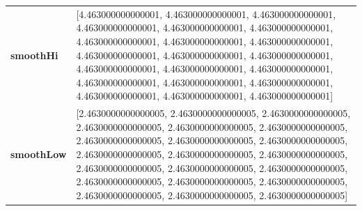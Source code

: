 		\begin{table}[H]
			\centering
			\begin{tabularx}{\textwidth}{lX}
		\textbf{smoothHi}& [4.463000000000001, 4.463000000000001, 4.463000000000001, 4.463000000000001, 4.463000000000001, 4.463000000000001, 4.463000000000001, 4.463000000000001, 4.463000000000001, 4.463000000000001, 4.463000000000001, 4.463000000000001, 4.463000000000001, 4.463000000000001, 4.463000000000001, 4.463000000000001, 4.463000000000001, 4.463000000000001, 4.463000000000001, 4.463000000000001, 4.463000000000001] \\
		\textbf{smoothLow} &[2.4630000000000005, 2.4630000000000005, 2.4630000000000005, 2.4630000000000005, 2.4630000000000005, 2.4630000000000005, 2.4630000000000005, 2.4630000000000005, 2.4630000000000005, 2.4630000000000005, 2.4630000000000005, 2.4630000000000005, 2.4630000000000005, 2.4630000000000005, 2.4630000000000005, 2.4630000000000005, 2.4630000000000005, 2.4630000000000005, 2.4630000000000005, 2.4630000000000005, 2.4630000000000005]\\
		
		
	\end{tabularx} 
\end{table}
